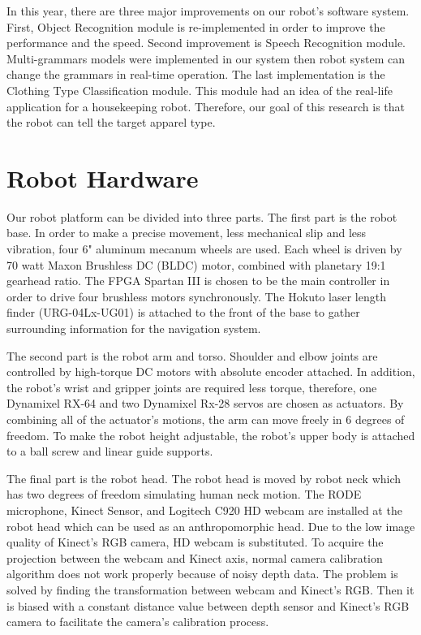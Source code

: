 \documentclass{llncs}
\begin{document}
In this year, there are three major improvements on our robot’s software system. First, Object Recognition module is re-implemented in order to improve the performance and the speed. Second improvement is Speech Recognition module. Multi-grammars models were implemented in our system then robot system can change the grammars in real-time operation. The last implementation is the Clothing Type Classification module. This module had an idea of the real-life application for a housekeeping robot. Therefore, our goal of this research is that the robot can tell the target apparel type.

\section{Robot Hardware} 
Our robot platform can be divided into three parts. The first part is the robot base. In order to make a precise movement, less mechanical slip and less vibration, four 6" aluminum mecanum wheels are used. Each wheel is driven by 70 watt Maxon Brushless DC (BLDC) motor, combined with planetary 19:1 gearhead ratio. The FPGA Spartan III is chosen to be the main controller in order to drive four brushless motors synchronously. The Hokuto laser length finder (URG-04Lx-UG01) is attached to the front of the base to gather surrounding information for the navigation system.

The second part is the robot arm and torso. Shoulder and elbow joints are controlled by high-torque DC motors with absolute encoder attached. In addition, the robot’s wrist and gripper joints are required less torque, therefore, one Dynamixel RX-64 and two Dynamixel Rx-28 servos are chosen as actuators. By combining all of the actuator's motions, the arm can move freely in 6 degrees of freedom. To make the robot height adjustable, the robot’s upper body is attached to a ball screw and linear guide supports.
    
The final part is the robot head. The robot head is moved by robot neck which has two degrees of freedom simulating human neck motion. The RODE microphone, Kinect Sensor, and Logitech C920 HD webcam are installed at the robot head which can be used as an anthropomorphic head. Due to the low image quality of Kinect's RGB camera, HD webcam is substituted. To acquire the projection between the webcam and Kinect axis, normal camera calibration algorithm does not work properly because of noisy depth data. The problem is solved by finding the transformation between webcam and Kinect's RGB. Then it is biased with a constant distance value between depth sensor and Kinect's RGB camera to facilitate the camera’s calibration process.
\end{document}
